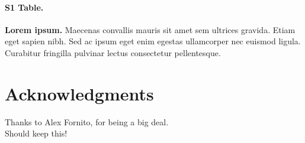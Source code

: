 \documentclass[10pt,letterpaper]{article}
\begin{document}
\paragraph*{S1 Table.}
\label{S1_Table}
{\bf Lorem ipsum.} Maecenas convallis mauris sit amet sem ultrices gravida. Etiam eget sapien nibh. Sed ac ipsum eget enim egestas ullamcorper nec euismod ligula. Curabitur fringilla pulvinar lectus consectetur pellentesque.

\section*{Acknowledgments}
Thanks to Alex Fornito, for being a big deal.\\
Should keep this!
\nolinenumbers

%
%
% 



%
%

\end{document}
